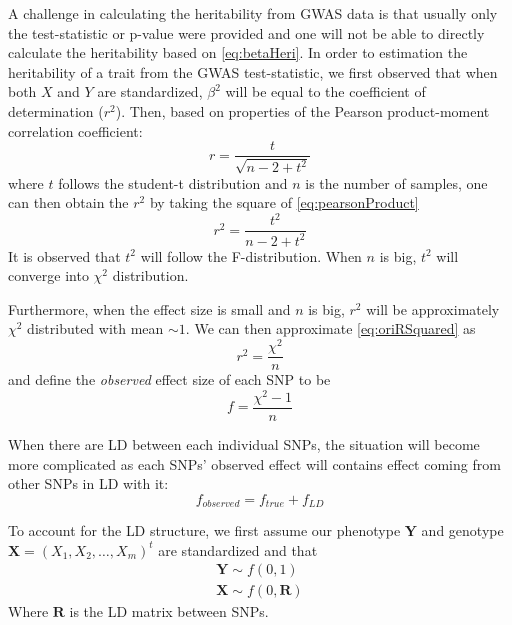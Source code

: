 			A challenge in calculating the heritability from \gls{GWAS} data is that usually only the test-statistic or p-value were provided and one will not be able to directly calculate the heritability based on \cref{eq:betaHeri}. 
			In order to estimation the heritability of a trait from the \gls{GWAS} test-statistic, we first observed that when both $X$ and $Y$ are standardized, $\beta^2$ will be equal to the coefficient of determination ($r^2$). 
			Then, based on properties of the Pearson product-moment correlation coefficient:
			\begin{equation}
				r = \frac{t}{\sqrt{n-2+t^2}}
				\label{eq:pearsonProduct}
			\end{equation}
			where $t$ follows the student-t distribution and $n$ is the number of samples, one can then obtain the $r^2$ by taking the square of \cref{eq:pearsonProduct}
			\begin{equation}
				r^2 = \frac{t^2}{n-2+t^2}
				\label{eq:oriRSquared}
			\end{equation}
			It is observed that $t^2$ will follow the F-distribution.
			When $n$ is big, $t^2$ will converge into $\chi^2$ distribution.
			
			Furthermore, when the effect size is small and $n$ is big, $r^2$ will be approximately $\chi^2$ distributed with mean $\sim 1$. 
			We can then approximate \cref{eq:oriRSquared} as
			\begin{equation}
				r^2= \frac{\chi^2}{n}
				\label{eq:approxChi}
			\end{equation}
			and define the \emph{observed} effect size of each \gls{SNP} to be
			\begin{equation}
			f=\frac{\chi^2-1}{n}
			\label{eq:observedEffect}
			\end{equation}
			
			When there are \gls{LD} between each individual \glspl{SNP}, the situation will become more complicated as each \glspl{SNP}' observed effect will contains effect coming from other \glspl{SNP} in \gls{LD} with it:
			\begin{equation}
			f_{observed} = f_{true}+f_{LD}
			\label{eq:conceptF}
			\end{equation}
			
			To account for the \gls{LD} structure, we first assume our phenotype $\boldsymbol{Y}$ and genotype $\boldsymbol{X}=(X_1,X_2,\dots,X_m)^t$ are standardized and that
			\begin{align*}
				\boldsymbol{Y}\sim f(0,1) \\
				\boldsymbol{X}\sim f(0,\boldsymbol{R})
			\end{align*}
			Where $\boldsymbol{R}$ is the \gls{LD} matrix between \glspl{SNP}.
			
